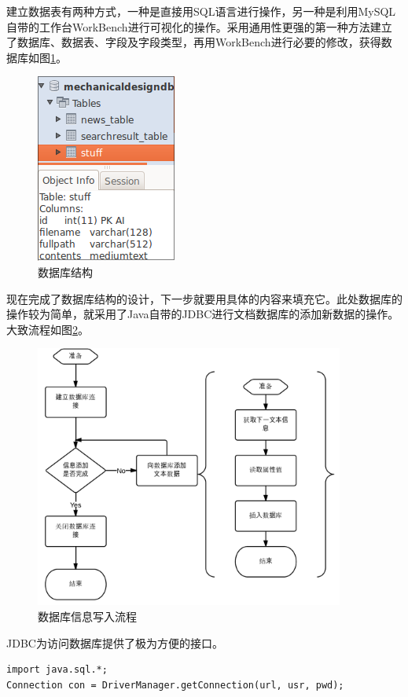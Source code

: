\documentclass[12pt,a4paper]{article}
\begin{document}
	建立数据表有两种方式，一种是直接用SQL语言进行操作，另一种是利用MySQL自带的工作台WorkBench进行可视化的操作。采用通用性更强的第一种方法建立了数据库、数据表、字段及字段类型，再用WorkBench进行必要的修改，获得数据库如图\ref{fig:数据库结构}。
	
	\begin{figure}[htbp] 
	\centering\includegraphics[scale=0.5]{fig/stuffdb.png} 
	\caption{数据库结构}\label{fig:数据库结构} 
	\end{figure}
	
	现在完成了数据库结构的设计，下一步就要用具体的内容来填充它。此处数据库的操作较为简单，就采用了Java自带的JDBC进行文档数据库的添加新数据的操作。大致流程如图\ref{fig:数据库信息写入流程}。
	
	\begin{figure}[htbp] 
	\centering\includegraphics[width=4in]{fig/createdb.png} 
	\caption{数据库信息写入流程}\label{fig:数据库信息写入流程} 
	\end{figure}
	
	JDBC为访问数据库提供了极为方便的接口。
	\lstset{language=Java,frame=lines}
	\begin{lstlisting}
import java.sql.*;
Connection con = DriverManager.getConnection(url, usr, pwd);
	\end{lstlisting}	
\end{document}

